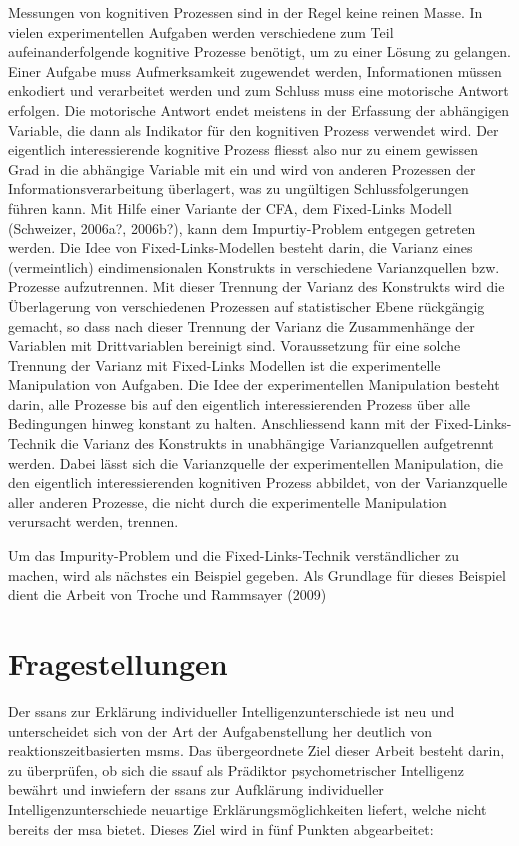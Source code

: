 \documentclass[11pt, twoside, a4paper]{book}		%
\begin{document}
Messungen von kognitiven Prozessen sind in der Regel keine reinen Masse. In vielen experimentellen Aufgaben werden verschiedene zum Teil aufeinanderfolgende kognitive Prozesse benötigt, um zu einer Lösung zu gelangen. Einer Aufgabe muss Aufmerksamkeit zugewendet werden, Informationen müssen enkodiert und verarbeitet werden und zum Schluss muss eine motorische Antwort erfolgen. Die motorische Antwort endet meistens in der Erfassung der abhängigen Variable, die dann als Indikator für den kognitiven Prozess verwendet wird. Der eigentlich interessierende kognitive Prozess fliesst also nur zu einem gewissen Grad in die abhängige Variable mit ein und wird von anderen Prozessen der Informationsverarbeitung überlagert, was zu ungültigen Schlussfolgerungen führen kann. Mit Hilfe einer Variante der CFA, dem Fixed-Links Modell (Schweizer, 2006a?, 2006b?), kann dem Impurtiy-Problem entgegen getreten werden. Die Idee von Fixed-Links-Modellen besteht darin, die Varianz eines (vermeintlich) eindimensionalen Konstrukts in verschiedene Varianzquellen bzw. Prozesse aufzutrennen. Mit dieser Trennung der Varianz des Konstrukts wird die Überlagerung von verschiedenen Prozessen auf statistischer Ebene rückgängig gemacht, so dass nach dieser Trennung der Varianz die Zusammenhänge der Variablen mit Drittvariablen bereinigt sind. Voraussetzung für eine solche Trennung der Varianz mit Fixed-Links Modellen ist die experimentelle Manipulation von Aufgaben. Die Idee der experimentellen Manipulation besteht darin, alle Prozesse bis auf den eigentlich interessierenden Prozess über alle Bedingungen hinweg konstant zu halten. Anschliessend kann mit der Fixed-Links-Technik die Varianz des Konstrukts in unabhängige Varianzquellen aufgetrennt werden. Dabei lässt sich die Varianzquelle der experimentellen Manipulation, die den eigentlich interessierenden kognitiven Prozess abbildet, von der Varianzquelle aller anderen Prozesse, die nicht durch die experimentelle Manipulation verursacht werden, trennen.

Um das Impurity-Problem und die Fixed-Links-Technik verständlicher zu machen, wird als nächstes ein Beispiel gegeben. Als Grundlage für dieses Beispiel dient die Arbeit von Troche und Rammsayer (2009)

\section{Fragestellungen \label{sec:Fragestellungen}}

Der \gls{ssans} zur Erklärung individueller Intelligenzunterschiede ist neu und unterscheidet sich von der Art der Aufgabenstellung her deutlich von reaktionszeitbasierten \glspl{msm}. Das übergeordnete Ziel dieser Arbeit besteht darin, zu überprüfen, ob sich die \gls{ssauf} als Prädiktor psychometrischer Intelligenz bewährt und inwiefern der \gls{ssans} zur Aufklärung individueller Intelligenzunterschiede neuartige Erklärungsmöglichkeiten liefert, welche nicht bereits der \gls{msa} bietet. Dieses Ziel wird in fünf Punkten abgearbeitet:
\end{document}

